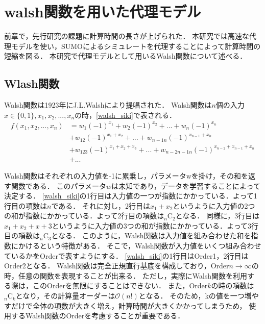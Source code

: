 \documentclass[main]{subfiles}
\begin{document}
\chapter{walsh関数を用いた代理モデル}
    前章で，先行研究の課題に計算時間の長さが上げられた．
    本研究では高速な代理モデルを使い，SUMOによるシミュレートを代理することによって計算時間の短縮を図る．
    本研究で代理モデルとして用いるWalsh関数について述べる．

    \section{Wlash関数}   
    Walsh関数\cite{walsh}は1923年にJ.L.Walshにより提唱された．
    Walsh関数は$n$個の入力$x \in \{0, 1\}, x_1, x_2, ..., x_n$の時，\ref{walsh_siki}で表される．
    \begin{equation}
        \begin{split}
            f(x_1, x_2, ..., x_n) &= w_1(-1)^{x_1} + w_2(-1)^{x_2} + ... + w_n(-1)^{x_n} \\
            &+ w_{12}(-1)^{x_1+x_2} + ... + w_{n-1n}(-1)^{x_{n-1}+x_n} \\
            &+ w_{123}(-1)^{x_1+x_2+x_3} + ... + w_{n-2n-1n}(-1)^{x_{n-2}+x_{n-1}+x_n} \\
            &+ ...
            \label{walsh_siki}
        \end{split}
    \end{equation}
    
    Walsh関数はそれぞれの入力値を-1に累乗し，パラメータwを掛け，その和を返す関数である．
    このパラメータ$w$は未知であり，データを学習することによって決定する．
    \ref{walsh_siki}の1行目は入力値の一つが指数にかかっている．よって1行目の項数は$n$である．
    それに対し，2行目は$x_1+x_2$というように入力値の2つの和が指数にかかっている．よって2行目の項数は${}_n \mathrm{C}_2$となる．
    同様に，3行目は$x_1+x_2+x+3$というように入力値の3つの和が指数にかかっている．よって3行目の項数は${}_n \mathrm{C}_3$となる．
    このように，Walsh関数は入力値を組み合わせた和を指数にかけるという特徴がある．
    そこで，Walsh関数が入力値をいくつ組み合わせているかをOrderで表すようにする．
    \ref{walsh_siki}の1行目はOrder1，2行目はOrder2となる．
    Walsh関数は完全正規直行基底を構成しており，Order$n\to \infty$の時，任意の関数を表現することが出来る．
    ただし，実際にWalsh関数を利用する際は，このOrderを無限にすることはできない．
    また，Order$k$の時の項数は${}_n \mathrm{C}_k$となり，その計算量オーダーは$\mathcal{O}(n!)$となる．
    そのため，kの値を一つ増やすだけで全体の項数が大きく増え，計算時間が大きくかかってしまうため，
    使用するWalsh関数のOrderを考慮することが重要である．
\end{document}
